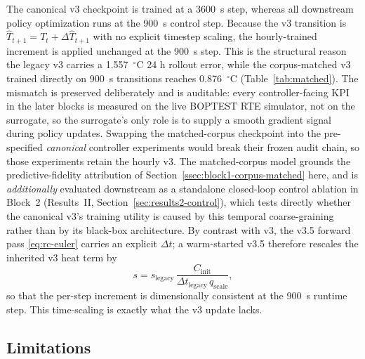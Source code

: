 \documentclass[11pt,a4paper]{article}
\newcommand{\That}{\ensuremath{\widehat{T}}}
\begin{document}
The canonical v3 checkpoint is trained at a 3600~s step, whereas all downstream policy optimization runs at the 900~s control step. Because the v3 transition is \(\That_{t+1}=T_t+\Delta\That_{t+1}\) with no explicit timestep scaling, the hourly-trained increment is applied unchanged at the 900~s step. This is the structural reason the legacy v3 carries a 1.557~$^\circ$C 24 h rollout error, while the corpus-matched v3 trained directly on 900~s transitions reaches 0.876~$^\circ$C (Table~\ref{tab:matched}). The mismatch is preserved deliberately and is auditable: every controller-facing KPI in the later blocks is measured on the live BOPTEST RTE simulator, not on the surrogate, so the surrogate's only role is to supply a smooth gradient signal during policy updates. Swapping the matched-corpus checkpoint into the pre-specified \emph{canonical} controller experiments would break their frozen audit chain, so those experiments retain the hourly v3. The matched-corpus model grounds the predictive-fidelity attribution of Section~\ref{ssec:block1-corpus-matched} here, and is \emph{additionally} evaluated downstream as a standalone closed-loop control ablation in Block~2 (Results~II, Section~\ref{sec:results2-control}), which tests directly whether the canonical v3's training utility is caused by this temporal coarse-graining rather than by its black-box architecture. By contrast with v3, the v3.5 forward pass \eqref{eq:rc-euler} carries an explicit \(\Delta t\); a warm-started v3.5 therefore rescales the inherited v3 heat term by
\begin{equation}
  s = s_{\mathrm{legacy}}\,\frac{C_{\mathrm{init}}}{\Delta t_{\mathrm{legacy}}\,q_{\mathrm{scale}}},
  \label{eq:warmstart-scale}
\end{equation}
so that the per-step increment is dimensionally consistent at the 900~s runtime step. This time-scaling is exactly what the v3 update lacks.

\subsection{Limitations}
\label{ssec:block1-limitations}
\end{document}
